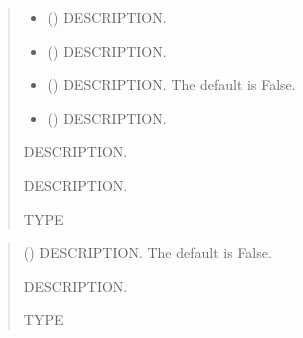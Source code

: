 \documentclass[letterpaper,10pt,english]{sphinxmanual}
\begin{document}
\begin{fulllineitems}
\begin{fulllineitems}
\begin{quote}
\begin{description}
\begin{itemize}
\item {} 
\sphinxAtStartPar
{} () \textendash{} DESCRIPTION.

\item {} 
\sphinxAtStartPar
{} () \textendash{} DESCRIPTION.

\item {} 
\sphinxAtStartPar
{} (\sphinxstyleliteralemphasis{\sphinxupquote{, }}) \textendash{} DESCRIPTION. The default is False.

\item {} 
\sphinxAtStartPar
{} () \textendash{} DESCRIPTION.

\end{itemize}

\sphinxAtStartPar
{} \textendash{} DESCRIPTION.

\sphinxAtStartPar
{} \textendash{} DESCRIPTION.

\sphinxAtStartPar
TYPE

\end{description}\end{quote}

\end{fulllineitems}


\begin{fulllineitems}
\label{\detokenize{query:ggcas.query.GaiaQuery.printTable}}
\pysigstartsignatures
{}
\pysigstopsignatures\begin{quote}\begin{description}
\sphinxAtStartPar
{} (\sphinxstyleliteralemphasis{\sphinxupquote{, }}) \textendash{} DESCRIPTION. The default is False.

\sphinxAtStartPar
DESCRIPTION.

\sphinxAtStartPar
TYPE

\end{description}\end{quote}

\end{fulllineitems}


\end{fulllineitems}
\end{document}
